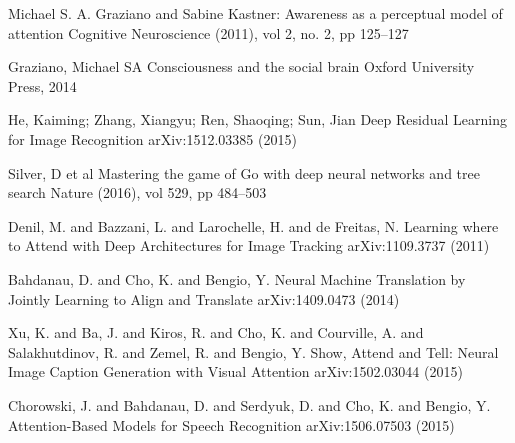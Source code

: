 \documentclass[citeauthoryear]{llncs}
\begin{document}
\begin{thebibliography}{}
Michael S. A.   Graziano  and  Sabine   Kastner:
Awareness as a perceptual model of attention
Cognitive Neuroscience (2011), vol 2, no. 2, pp 125--127


Graziano, Michael SA
Consciousness and the social brain
Oxford University Press, 2014



He, Kaiming; Zhang, Xiangyu; Ren, Shaoqing; Sun, Jian
Deep Residual Learning for Image Recognition
arXiv:1512.03385 (2015)


Silver, D et al
Mastering the game of Go with deep neural networks and tree search
Nature (2016), vol 529, pp 484--503

{Denil}, M. and {Bazzani}, L. and {Larochelle}, H. and {de Freitas}, N.
Learning where to Attend with Deep Architectures for Image Tracking
arXiv:1109.3737 (2011)

{Bahdanau}, D. and {Cho}, K. and {Bengio}, Y.
Neural Machine Translation by Jointly Learning to Align and Translate
arXiv:1409.0473 (2014)


{Xu}, K. and {Ba}, J. and {Kiros}, R. and {Cho}, K. and {Courville}, A. and {Salakhutdinov}, R. and {Zemel}, R. and {Bengio}, Y.
Show, Attend and Tell: Neural Image Caption Generation with Visual Attention
arXiv:1502.03044 (2015)

{Chorowski}, J. and {Bahdanau}, D. and {Serdyuk}, D. and {Cho}, K. and {Bengio}, Y.
Attention-Based Models for Speech Recognition
arXiv:1506.07503 (2015)


\end{thebibliography}
\end{document}
